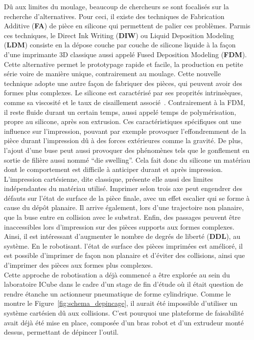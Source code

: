\documentclass[11pt,a4paper]{article}
\begin{document}
    Dû aux limites du moulage, beaucoup de chercheurs se sont focalisés sur la recherche d'alternatives. Pour ceci, il existe des techniques de Fabrication Additive (\textbf{FA}) de pièce en silicone qui permettent de palier ces problèmes. Parmis ces techniques, le Direct Ink Writing (\textbf{DIW}) ou Liquid Deposition Modeling (\textbf{LDM}) consiste en la dépose couche par couche de silicone liquide à la façon d'une imprimante 3D classique aussi appelé Fused Deposition Modeling (\textbf{FDM}). Cette alternative permet le prototypage rapide et facile, la production en petite série voire de manière unique, contrairement au moulage. Cette nouvelle technique adopte une autre façon de fabriquer des pièces, qui peuvent avoir des formes plus complexes.  
    Le silicone est caractérisé par ses proprités intrinsèques, comme sa viscosité et le taux de cisaillement associé~\cite{lefort1983silicones}. Contrairement à la FDM, il reste fluide durant un certain temps, aussi appelé temps de polymérisation, propre au silicone, après son extrusion. Ces caractéristiques spécifiques ont une influence sur l'impression, pouvant par exemple provoquer l'effondremment de la pièce durant l'impression dû à des forces extérieures comme la gravité. De plus, l'ajout d'une buse peut aussi provoquer des phénomènes tels que le gonflement en sortie de filière aussi nommé ``die swelling''. Cela fait donc du silicone un matériau dont le comportement est difficile à anticiper durant et après impression.~\\ 

    L'impression cartésienne, dite classique, présente elle aussi des limites indépendantes du matériau utilisé. Imprimer selon trois axe peut engendrer des défauts sur l'état de surface de la pièce finale, avec un effet escalier qui se forme à cause du dépôt planaire. Il arrive également, lors d'une trajectoire non planaire, que la buse entre en collision avec le substrat. Enfin, des passages peuvent être inaccessibles lors d'impression sur des pièces supports aux formes complexes. Ainsi, il est intéressant d'augmenter le nombre de degrés de liberté (\textbf{DDL}), au système. En le robotisant. l'état de surface des pièces imprimées est amélioré, il est possible d'imprimer de façon non planaire et d'éviter des collisions, ainsi que d'imprimer des pièces aux formes plus complexes.~\\
    
    Cette approche de robotisation a déjà commencé a être explorée au sein du laboratoire ICube dans le cadre d'un stage de fin d'étude où il était question de rendre étanche un actionneur pneumatique de forme cylindrique. Comme le montre le Figure~\ref{fig:schema_depincage}, il aurait été impossible d'utiliser un système cartésien dû aux collisions. C'est pourquoi une plateforme de faisabilité avait déjà été mise en place, composée d'un bras robot et d'un extrudeur monté dessus, permettant de dépincer l'outil. 
\end{document}
